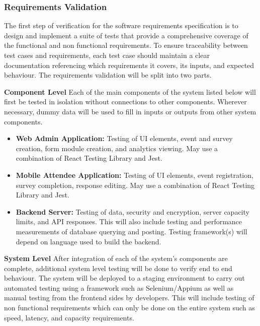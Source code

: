 \documentclass[12pt, titlepage]{article}
\begin{document}
\subsubsection{Requirements Validation}
The first step of verification for the software requirements specification is to design and implement a suite of tests that provide a comprehensive coverage of the functional and non functional requirements. To ensure traceability between test cases and requirements, each test case should maintain a clear documentation referencing which requirements it covers, its inputs, and expected behaviour. The requirements validation will be split into two parts.

\textbf{Component Level}
Each of the main components of the system listed below will first be tested in isolation without connections to other components. Wherever necessary, dummy data will be used to fill in inputs or outputs from other system components.
\begin{itemize}
  \item \textbf{Web Admin Application:} Testing of UI elements, event and survey creation, form module creation, and analytics viewing. May use a combination of React Testing Library and Jest.
  \item \textbf{Mobile Attendee Application:} Testing of UI elements, event registration, survey completion, response editing. May use a combination of React Testing Library and Jest.
  \item \textbf{Backend Server:} Testing of data, security and encryption, server capacity limits, and API responses. This will also include testing and performance measurements of database querying and posting. Testing framework(s) will depend on language used to build the backend.
\end{itemize}

\textbf{System Level}
  After integration of each of the system's components are complete, additional system level testing will be done to verify end to end behaviour. The system will be deployed to a staging environment to carry out automated testing using a framework such as Selenium/Appium as well as manual testing from the frontend sides by developers. This will include testing of non functional requirements which can only be done on the entire system such as speed, latency, and capacity requirements.
\end{document}
